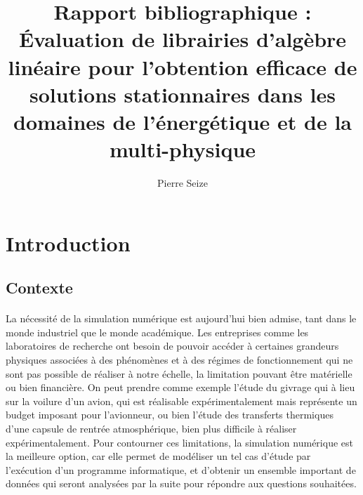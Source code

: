 \documentclass[a4paper]{article}
\title{Rapport bibliographique :\\[\baselineskip]\large Évaluation de librairies d'algèbre linéaire pour l'obtention efficace de solutions stationnaires dans les domaines de l'énergétique et de la multi-physique}
\author{Pierre Seize}
\date{}
\begin{document}
\maketitle


\section{Introduction}

	\subsection{Contexte}

		\paragraph{} La nécessité de la simulation numérique est aujourd'hui bien admise, tant dans le monde industriel que le monde académique.
		Les entreprises comme les laboratoires de recherche ont besoin de pouvoir accéder à certaines grandeurs physiques associées à des phénomènes et à des régimes de fonctionnement qui ne sont pas possible de réaliser à notre échelle, la limitation pouvant être matérielle ou bien financière.
		On peut prendre comme exemple l'étude du givrage qui à lieu sur la voilure d'un avion, qui est réalisable expérimentalement mais représente un budget imposant pour l’avionneur, ou bien l'étude des transferts thermiques d'une capsule de rentrée atmosphérique, bien plus difficile à réaliser expérimentalement.
		Pour contourner ces limitations, la simulation numérique est la meilleure option, car elle permet de modéliser un tel cas d'étude par l’exécution d'un programme informatique, et d'obtenir un ensemble important de données qui seront analysées par la suite pour répondre aux questions souhaitées.
\end{document}
